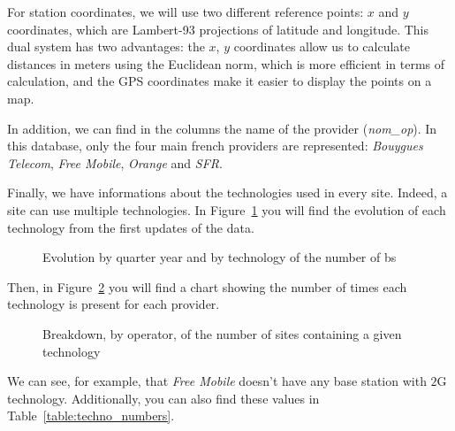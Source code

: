 \documentclass[lettersize,journal,english]{IEEEtran}
\begin{document}
        For station coordinates, we will use two different reference points: $x$ and $y$ coordinates, which are Lambert-93 projections of latitude and longitude.
        This dual system has two advantages: the $x$, $y$ coordinates allow us to calculate distances in meters using the Euclidean norm, which is more efficient in terms of calculation, and the GPS coordinates make it easier to display the points on a map.

        In addition, we can find in the columns the name of the provider (\textsl{nom\_op}). In this database, only the four main french providers are represented:
        \emph{Bouygues Telecom}, \emph{Free Mobile}, \emph{Orange} and \emph{SFR}.

        Finally, we have informations about the technologies used in every site. Indeed, a site can use multiple technologies.
        In Figure~\ref{fig:data_evolution} you will find the evolution of each technology from the first updates of the data.
        \begin{figure}
            \centering
            \caption{Evolution by quarter year and by technology of the number of \acrshort{bs}}
            \label{fig:data_evolution}
        \end{figure}
        Then, in Figure~\ref{fig:data_technos} you will find a chart showing the number of times each technology is present for each provider.
        \begin{figure}
            \centering
            \caption{Breakdown, by operator, of the number of sites containing a given technology}
            \label{fig:data_technos}
        \end{figure}
        We can see, for example, that \emph{Free Mobile} doesn't have any base station with $2$G technology. Additionally, you can also find these values in Table~\ref{table:techno_numbers}.
\end{document}
